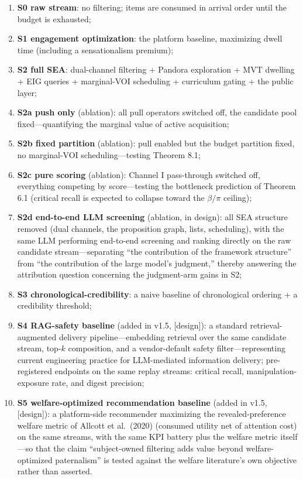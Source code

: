 \documentclass[
  11pt]{article}
\providecommand{\tightlist}{%
  \setlength{\itemsep}{0pt}\setlength{\parskip}{0pt}}
\begin{document}
\begin{enumerate}
\def\labelenumi{\arabic{enumi}.}
\tightlist
\item
  \textbf{S0 raw stream}: no filtering; items are consumed in arrival
  order until the budget is exhausted;
\item
  \textbf{S1 engagement optimization}: the platform baseline, maximizing
  dwell time (including a sensationalism premium);
\item
  \textbf{S2 full SEA}: dual-channel filtering + Pandora exploration +
  MVT dwelling + EIG queries + marginal-VOI scheduling + curriculum
  gating + the public layer;
\item
  \textbf{S2a push only} (ablation): all pull operators switched off,
  the candidate pool fixed---quantifying the marginal value of active
  acquisition;
\item
  \textbf{S2b fixed partition} (ablation): pull enabled but the budget
  partition fixed, no marginal-VOI scheduling---testing Theorem 8.1;
\item
  \textbf{S2c pure scoring} (ablation): Channel I pass-through switched
  off, everything competing by score---testing the bottleneck prediction
  of Theorem 6.1 (critical recall is expected to collapse toward the
  \(\beta/\pi\) ceiling);
\item
  \textbf{S2d end-to-end LLM screening} (ablation, in design): all SEA
  structure removed (dual channels, the proposition graph, lists,
  scheduling), with the same LLM performing end-to-end screening and
  ranking directly on the raw candidate stream---separating ``the
  contribution of the framework structure'' from ``the contribution of
  the large model's judgment,'' thereby answering the attribution
  question concerning the judgment-arm gains in S2;
\item
  \textbf{S3 chronological-credibility}: a naive baseline of
  chronological ordering + a credibility threshold;
\item
  \textbf{S4 RAG-safety baseline} (added in v1.5, {[}design{]}): a
  standard retrieval-augmented delivery pipeline---embedding retrieval
  over the same candidate stream, top-\(k\) composition, and a
  vendor-default safety filter---representing current engineering
  practice for LLM-mediated information delivery; pre-registered
  endpoints on the same replay streams: critical recall,
  manipulation-exposure rate, and digest precision;
\item
  \textbf{S5 welfare-optimized recommendation baseline} (added in v1.5,
  {[}design{]}): a platform-side recommender maximizing the
  revealed-preference welfare metric of Allcott et al.~(2020) (consumed
  utility net of attention cost) on the same streams, with the same KPI
  battery plus the welfare metric itself---so that the claim
  ``subject-owned filtering adds value beyond welfare-optimized
  paternalism'' is tested against the welfare literature's own objective
  rather than asserted.
\end{enumerate}
\end{document}
